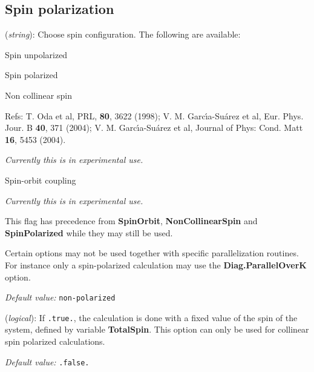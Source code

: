 \vspace{5pt}
\subsection{Spin polarization}

\begin{description}
\itemsep 10pt
\parsep 0pt

\item[\textbf{Spin}] (\textit{string}):
Choose spin configuration. The following are available:
\begin{description}
\itemsep 2pt
\parsep 0pt
\small
\item[non-polarized] Spin unpolarized

\item[polarized] Spin polarized

\item[non-collinear] Non collinear spin

Refs: T. Oda et al, PRL, \textbf{80}, 3622 (1998); 
V. M. Garc\'{\i}a-Su\'arez et al, Eur. Phys. Jour. B \textbf{40}, 371 (2004);
V. M. Garc\'{\i}a-Su\'arez et al, Journal of
Phys: Cond. Matt \textbf{16}, 5453 (2004).

\emph{Currently this is in experimental use.}

\item[spin-orbit] Spin-orbit coupling

\emph{Currently this is in experimental use.}
\end{description}

This flag has precedence from \textbf{SpinOrbit}, \textbf{NonCollinearSpin} and
\textbf{SpinPolarized} while they may still be used.

Certain options may not be used together with specific parallelization routines.
For instance only a spin-polarized calculation may use the \textbf{Diag.ParallelOverK}
option. 

\textit{Default value:} \texttt{non-polarized}

\item[\textbf{FixSpin}] (\textit{logical}):
If \texttt{.true.}, the calculation is done with a fixed value of the
spin of the system, defined by variable  \textbf{TotalSpin}.
This option can only be used for collinear spin polarized
calculations.

\textit{Default value:} \texttt{.false.}


\end{description}
